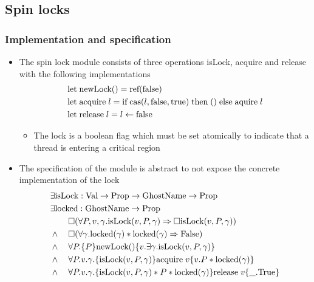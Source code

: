 \subsection{Spin locks}
\subsubsection{Implementation and specification}
\begin{itemize}
	\item The spin lock module consists of three operations isLock, acquire and release with the following implementations
  \begin{align*}
    &\text{let} \; \text{newLock}() = \text{ref}(\text{false}) \\
    &\text{let} \; \text{acquire} \; l = \text{if} \; \text{cas}(l,\text{false}, \text{true}) \; \text{then} \; () \; \text{else} \; \text{aquire} \; l \\
    &\text{let} \; \text{release} \; l = l \leftarrow \text{false}
  \end{align*}
  \begin{itemize}
  	\item The lock is a boolean flag which must be set atomically to indicate that a thread is entering a critical region
  \end{itemize}
  \item The specification of the module is abstract to not expose the concrete implementation of the lock
  \begin{align*} 
    & \exists \text{isLock} : \Val \rightarrow \Prop \rightarrow \text{GhostName} \rightarrow \Prop \\
    & \exists \text{locked} : \text{GhostName} \rightarrow \Prop \\
    & \hspace{21px} \square (\forall P, v, \gamma. \text{isLock}(v,P, \gamma) \Rightarrow \square \text{isLock}(v,P,\gamma))\\
    & \land \quad \square (\forall \gamma . \text{locked}(\gamma) * \text{locked}(\gamma) \Rightarrow \False) \\
    & \land \quad \forall P. \{P\} \text{newLock}() \{v. \exists \gamma. \text{isLock}(v,P, \gamma)\} \\
    & \land \quad \forall P.v.\gamma. \{\text{isLock}(v,P,\gamma)\} \text{acquire} \; v \{v.P * \text{locked}(\gamma)\} \\
    & \land \quad \forall P.v.\gamma. \{\text{isLock}(v,P,\gamma) * P * \text{locked}(\gamma)\} \text{release} \; v \{\_. \True\}
  \end{align*} 

\end{itemize}
